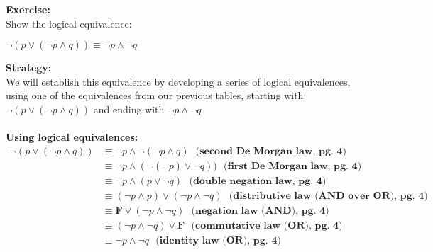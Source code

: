 \begin{tcolorbox}[title=Example 2: Construct new logical equivalence]
\textbf{Exercise:}  
\\ Show the logical equivalence: 
\begin{center}
$\neg (p \lor (\neg p\land q)) \equiv \neg p \land \neg q$
\end{center}

\textbf{Strategy:}  \\
We will establish this equivalence by developing a
series of logical equivalences, using one of the equivalences from our previous tables, starting with
$\neg (p \lor (\neg p\land q))$ and ending with $\neg p \land \neg q$ \\ \\
\textbf{Using logical equivalences:}   
\begin{align*}
\neg (p \lor (\neg p\land q)) &\equiv \neg p \land \neg (\neg p\land q) \ \ \ \textbf{(second De Morgan law, pg. 4)} \\
&\equiv \neg p \land (\neg (\neg p)\lor  \neg q)) \ \ \ \textbf{(first De Morgan law, pg. 4)} \\
&\equiv\neg p \land (p \lor \neg q) \ \ \ \textbf{(double negation law, pg. 4)} \\
&\equiv (\neg p \land p) \lor (\neg p \land \neg q) \ \ \ \textbf{(distributive law (AND over OR), pg. 4)} \\
&\equiv \mathbf{F} \lor (\neg p \land \neg q) \ \ \ \textbf{(negation law (AND), pg. 4)} \\
&\equiv (\neg p \land \neg q) \lor \mathbf{F}  \ \ \ \textbf{(commutative law (OR), pg. 4)} \\
&\equiv \neg p \land \neg q  \ \ \ \textbf{(identity law (OR), pg. 4)} \\
\end{align*}
\end{tcolorbox}

